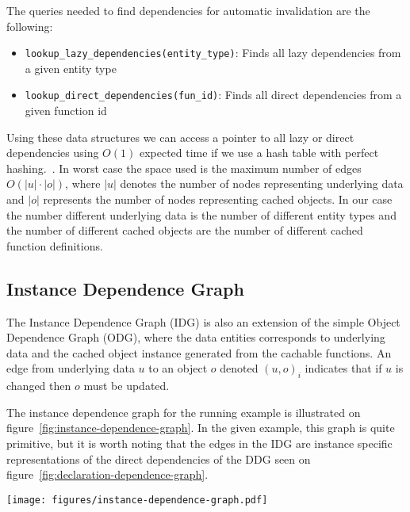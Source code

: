 The queries needed to find dependencies for automatic invalidation are the following:

\begin{itemize}
  \item \verb$lookup_lazy_dependencies(entity_type)$: Finds all lazy dependencies from a given entity type
  \item \verb$lookup_direct_dependencies(fun_id)$: Finds all direct dependencies from a given function id
\end{itemize}

Using these data structures we can access a pointer to all lazy or direct dependencies using $O(1)$ expected time if we use a hash table with perfect hashing.~\cite{paper:perfect-hashing}. In worst case the space used is the maximum number of edges $O(|u| \cdot |o|)$, where $|u|$ denotes the number of nodes representing underlying data and $|o|$ represents the number of nodes representing cached objects. In our case the number different underlying data is the number of different entity types and the number of different cached objects are the number of different cached function definitions.


\subsection{Instance Dependence Graph}
\label{subsec:instance-dependence-graph}

The Instance Dependence Graph (IDG) is also an extension of the simple Object Dependence Graph (ODG), where the data entities corresponds to underlying data and the cached object instance generated from the cachable functions. An edge from underlying data $u$ to an object $o$ denoted $(u, o)_i$ indicates that if $u$ is changed then $o$ must be updated.

The instance dependence graph for the running example is illustrated on figure~\ref{fig:instance-dependence-graph}. In the given example, this graph is quite primitive, but it is worth noting that the edges in the IDG are instance specific representations of the direct dependencies of the DDG seen on figure~\ref{fig:declaration-dependence-graph}.

\begin{figure*}[ht!]
  \centering
  \texttt{[image: figures/instance-dependence-graph.pdf]}
  \caption{An example of an Instance Dependence Graph based on the running example, where we have a single course entity that have two participant entities.}
  \label{fig:instance-dependence-graph}
\end{figure*}

